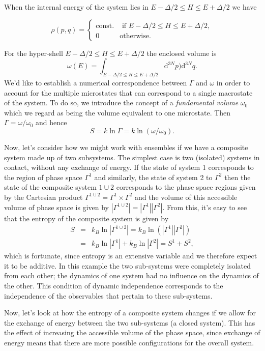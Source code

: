 When the internal energy of the system lies in $E-\Delta/2 \leq H \leq E+\Delta/2$ we have


\[ 
	\rho(p,q) = 
\begin{cases} 
      \mbox{const.} & \mbox{ if } E-\Delta/2 \leq H \leq E+\Delta/2, \\
      0 & \mbox{otherwise.} 
   \end{cases}
\]

For the hyper-shell $E-\Delta/2\leq H \leq E+\Delta/2$ the enclosed volume is
\[
\omega(E) = \int_{E-\Delta/2\leq H \leq E+\Delta/2} \mathrm{d}^{3N}p)\mathrm{d}^{3N}q.
\]
We'd like to establish a numerical correspondence between $\Gamma$ and $\omega$ in order to account for the multiple microstates that can correspond to a single macrostate of the system. To do so, we introduce the concept of a \emph{fundamental volume} $\omega_0$ which we regard as being the volume equivalent to one microstate. Then $\Gamma = \omega/\omega_0$ and hence
\[
S =k \ln\Gamma = k\ln(\omega/\omega_0).
\]


Now, let's consider how we might work with ensembles if we have a composite system made up of two subsystems. The simplest case is two (isolated) systems in contact, without any exchange of energy. If the state of system 1 corresponds to the region of phase space $\Gamma^1$ and similarly, the state of system 2 to $\Gamma^2$ then the state of the composite system $1\cup 2$ corresponds to the phase space regions given by the Cartesian product $\Gamma^{1\cup 2}=\Gamma^1\times\Gamma^2$ and the volume of this accessible volume of phase space is given by $|\Gamma^{1\cup 2}|=|\Gamma^1||\Gamma^2|$. From this, it's easy to see that the entropy of the composite system is given by
\begin{eqnarray*}
	S &=& k_B\ln|\Gamma^{1\cup 2}| = k_B\ln(|\Gamma^1||\Gamma^2|)\\
		&=& k_B\ln|\Gamma^1| + k_B\ln|\Gamma^2| = S^1 + S^2,
\end{eqnarray*}
which is fortunate, since entropy is an extensive variable and we therefore expect it to be additive.
In this example the two sub-systems were completely isolated from each other; the dynamics of one system had no influence on the dynamics of the other. This condition of dynamic independence corresponds to the independence of the observables that pertain to these sub-systems.

Now, let's look at how the entropy of a composite system changes if we allow for the exchange of energy between the two sub-systems (a closed system). This has the effect of increasing the accessible volume of the phase space, since exchange of energy means that there are more possible configurations for the overall system.

